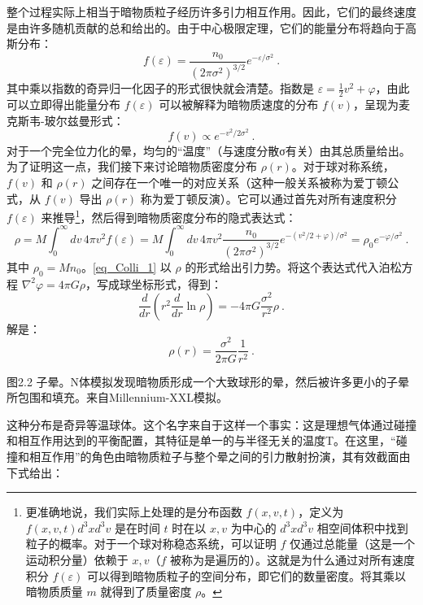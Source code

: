 整个过程实际上相当于暗物质粒子经历许多引力相互作用。因此，它们的最终速度是由许多随机贡献的总和给出的。由于中心极限定理，它们的能量分布将趋向于高斯分布：
\begin{equation}
 f(\varepsilon) =   \frac{n_0}{(2\pi\sigma^2)^{3/2}}  e^{-\varepsilon/\sigma^2} ~. 
\end{equation}
其中乘以指数的奇异归一化因子的形式很快就会清楚。指数是 \(\varepsilon = \frac{1}{2}v^2 + \varphi\)，由此可以立即得出能量分布 \(f(\varepsilon)\) 可以被解释为暗物质速度的分布 \(f(v)\)，呈现为麦克斯韦-玻尔兹曼形式：
\begin{equation}
 f(v) \propto e^{-v^2/2\sigma^2}~. 
\end{equation}
对于一个完全位力化的晕，均匀的“温度”（与速度分散σ有关）由其总质量给出。为了证明这一点，我们接下来讨论暗物质密度分布 \(\rho(r)\)。对于球对称系统，\(f(v)\) 和 \(\rho(r)\) 之间存在一个唯一的对应关系（这种一般关系被称为爱丁顿公式，从 \(f(v)\) 导出 \(\rho(r)\) 称为爱丁顿反演）。它可以通过首先对所有速度积分 \(f(\varepsilon)\) 来推导\footnote{更准确地说，我们实际上处理的是分布函数 \(f(x, v, t)\)，定义为 \(f(x, v, t) d^3x d^3v\) 是在时间 \(t\) 时在以 \(x, v\) 为中心的 $d^3x d^3v$ 相空间体积中找到粒子的概率。对于一个球对称稳态系统，可以证明 \(f\) 仅通过总能量（这是一个运动积分量）依赖于 \(x, v\)（\(f\) 被称为是遍历的）。这就是为什么通过对所有速度积分 \(f(\varepsilon)\) 可以得到暗物质粒子的空间分布，即它们的数量密度。将其乘以暗物质质量 \(m\) 就得到了质量密度 \(\rho\)。}，然后得到暗物质密度分布的隐式表达式：
\begin{equation}\label{eq_Colli_1}
 \rho = M \int_0^\infty dv \, 4\pi v^2 f(\varepsilon) = M \int_0^\infty dv \, 4\pi v^2 \frac{n_0}{(2\pi\sigma^2)^{3/2}} e^{-(v^2/2+\varphi)/\sigma^2} = \rho_0 e^{-\varphi/\sigma^2}~. 
\end{equation}
其中 \(\rho_0 = Mn_0\)。\autoref{eq_Colli_1} 以 \(\rho\) 的形式给出引力势。将这个表达式代入泊松方程 \(\nabla^2\varphi = 4\pi G\rho\)，写成球坐标形式，得到：
\begin{equation}
 \frac{d}{dr} \left( r^2 \frac{d}{dr} \ln\rho \right) = -4\pi G \frac{\sigma^2}{r^2} \rho~. 
\end{equation}
解是：
\begin{equation}
\rho(r) = \frac{\sigma^2}{2\pi G} \frac{1}{r^2}~. 
\end{equation}

图2.2 子晕。N体模拟发现暗物质形成一个大致球形的晕，然后被许多更小的子晕所包围和填充。来自Millennium-XXL模拟。

这种分布是奇异等温球体。这个名字来自于这样一个事实：这是理想气体通过碰撞和相互作用达到的平衡配置，其特征是单一的与半径无关的温度T。在这里，“碰撞和相互作用”的角色由暗物质粒子与整个晕之间的引力散射扮演，其有效截面由下式给出：


